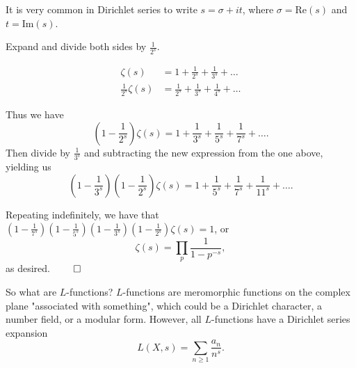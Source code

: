 \documentclass[a4paper, 12pt,oneside,openany]{book}
\begin{document}

It is very common in Dirichlet series to write $s=\sigma+it$, where $\sigma = \text{Re}(s)$ and $t=\text{Im}(s)$.


 Expand and divide both sides by $\frac{1}{2^s}$.

\begin{align*}
	\zeta(s) &= 1+\frac{1}{2^s}+\frac{1}{3^s}+\dots \\
	\frac{1}{2^s} \zeta(s) &= \frac{1}{2^s}+\frac{1}{3^s} + \frac{1}{4^s} + \dots
\end{align*}

Thus we have $$\left(1-\frac{1}{2^s}\right) \zeta(s) = 1+\frac{1}{3^s}+\frac{1}{5^s}+\frac{1}{7^s}+\dots.$$ Then divide by $\frac{1}{3^s}$ and subtracting the new expression from the one above, yielding us $$\left(1-\frac{1}{3^s}\right)\left(1-\frac{1}{2^s}\right) \zeta(s) = 1+\frac{1}{5^s}+\frac{1}{7^s}+\frac{1}{11^s}+\dots.$$

Repeating indefinitely, we have that $\left(1-\frac{1}{7^s}\right)\left(1-\frac{1}{5^s}\right)\left(1-\frac{1}{3^s}\right)\left(1-\frac{1}{2^s}\right)\zeta(s)=1$, or $$\zeta(s) = \prod\limits_p \frac{1}{1-p^{-s}},$$ as desired. $\qed$


So what are $L$-functions? $L$-functions are meromorphic functions on the complex plane "associated with something", which could be a Dirichlet character, a number field, or a modular form. However, all $L$-functions have a Dirichlet series expansion $$L(X, s)=\sum\limits_{n \geq 1} \frac{a_n}{n^s}.$$


\end{document}

